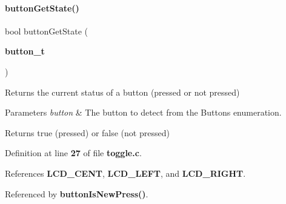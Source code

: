 \paragraph{button\+Get\+State()}
{\footnotesize\ttfamily bool button\+Get\+State (\begin{DoxyParamCaption}\item[{\textbf{ button\+\_\+t}}]{ }\end{DoxyParamCaption})}



Returns the current status of a button (pressed or not pressed) 


\begin{DoxyParams}{Parameters}
{\em button} & The button to detect from the Buttons enumeration.\\
\hline
\end{DoxyParams}
\begin{DoxyReturn}{Returns}
true (pressed) or false (not pressed) 
\end{DoxyReturn}


Definition at line \textbf{ 27} of file \textbf{ toggle.\+c}.



References \textbf{ L\+C\+D\+\_\+\+C\+E\+NT}, \textbf{ L\+C\+D\+\_\+\+L\+E\+FT}, and \textbf{ L\+C\+D\+\_\+\+R\+I\+G\+HT}.



Referenced by \textbf{ button\+Is\+New\+Press()}.


